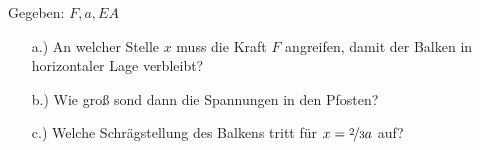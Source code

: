 Gegeben: $F, a, EA$

\begin{itemize}
\item[a.)]
  An welcher Stelle $x$ muss die Kraft $F$ angreifen, damit der Balken in horizontaler Lage verbleibt?

  \item[b.)]
    Wie groß sond dann die Spannungen in den Pfosten?

  \item[c.)]
    Welche Schrägstellung des Balkens tritt für $x = \nicefrac{2}{3}a$ auf?  
\end{itemize}

\begin{dmath*}
  
\end{dmath*}
